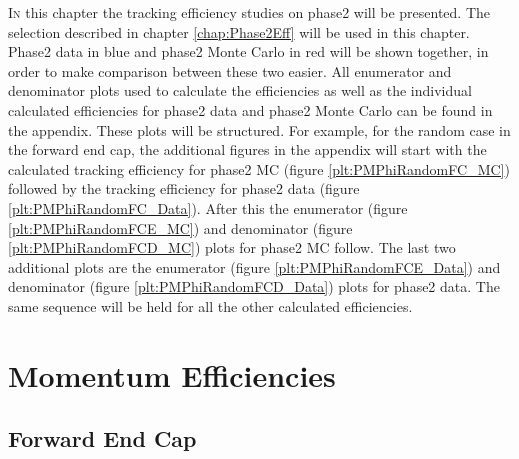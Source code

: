 \documentclass[a4paper,11pt,twosided,final,german,openbib,pdftex,listof=totoc,bibliography=totoc]{scrbook}
\begin{document}
\lettrine{I}{n} this chapter the tracking efficiency studies on phase2 will be presented. The selection described in chapter \ref{chap:Phase2Eff} will be used in this chapter. Phase2 data in blue and phase2 Monte Carlo in red will be shown together, in order to make comparison between these two easier. All enumerator and denominator plots used to calculate the efficiencies as well as the individual calculated efficiencies for phase2 data and phase2 Monte Carlo can be found in the appendix. These plots will be structured. For example, for the random case in the forward end cap, the additional figures in the appendix will start with the calculated tracking efficiency for phase2 MC (figure \ref{plt:PMPhiRandomFC_MC}) followed by the tracking efficiency for phase2 data (figure \ref{plt:PMPhiRandomFC_Data}). After this the enumerator (figure \ref{plt:PMPhiRandomFCE_MC}) and denominator (figure \ref{plt:PMPhiRandomFCD_MC}) plots for phase2 MC follow. The last two additional plots are the enumerator (figure \ref{plt:PMPhiRandomFCE_Data}) and denominator (figure \ref{plt:PMPhiRandomFCD_Data}) plots for phase2 data. The same sequence will be held for all the other calculated efficiencies.
 

\section{Momentum Efficiencies}


\subsection{Forward End Cap}
\label{sec:MFC}
\end{document}
